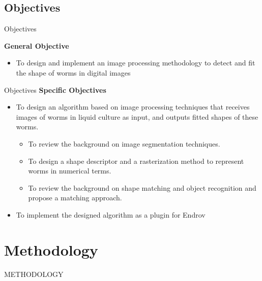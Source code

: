 \documentclass[xcolor=table]{beamer}
\begin{document}

\subsection{Objectives}
\begin{frame}{Objectives}
\vskip10pt

\large \textbf{General Objective}\\
\vskip7pt

\begin{itemize}
  \item To design and implement an image processing methodology 
to detect and fit the shape of worms in digital images
\end{itemize}

\end{frame}

\begin{frame}{Objectives}
\pause \large \textbf{Specific Objectives}\\
\vskip7pt

\begin{itemize}
  \item To design an algorithm based on image processing techniques that 
receives images of worms in liquid culture as input, and outputs fitted
 shapes of these worms.\pause
 \begin{itemize}
 \item To review the background on image segmentation techniques. \pause
 \item To design a shape descriptor and a rasterization method to 
   represent worms in numerical terms.\pause
 \item To review the background on shape matching and object recognition and
propose a matching approach.
 \end{itemize}
\pause 
\item To implement the designed algorithm as a plugin for Endrov
\end{itemize}

\end{frame}


\section{Methodology}
\begin{frame}{}
\begin{center}
\LARGE METHODOLOGY
\end{center}
\end{frame}
\end{document}
